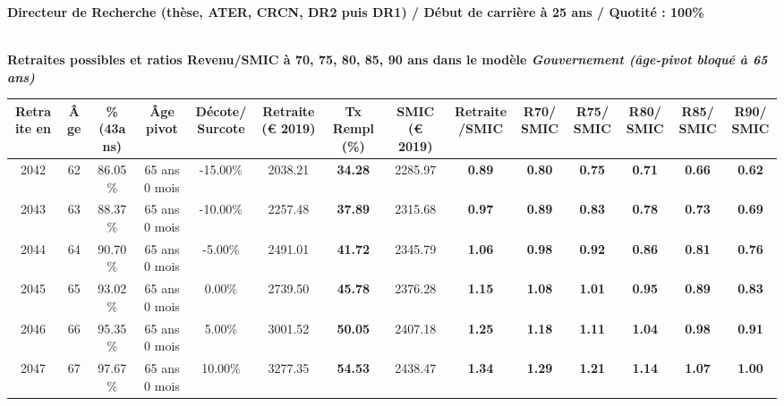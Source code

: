 {\bf \noindent Directeur de Recherche (thèse, ATER, CRCN, DR2 puis DR1) / Début de carrière à 25 ans / Quotité : 100\%}  ~ 

 ~\\{\bf \noindent Retraites possibles et ratios Revenu/SMIC à 70, 75, 80, 85, 90 ans dans le modèle \emph{Gouvernement (âge-pivot bloqué à 65 ans)}}  
 
\begin{adjustbox}{max width=\textwidth} 
\begin{tabular}[htb]{|c|c||c|c|c||c|c||c|c||c|c|c|c|c|} 
\hline 
 Retraite en &  Âge &  \%(43ans) &  Âge pivot &  Décote/Surcote &  Retraite (\euro{} 2019) &  Tx Rempl(\%) &  SMIC (\euro{} 2019) &  Retraite/SMIC &  R70/SMIC &  R75/SMIC &  R80/SMIC &  R85/SMIC &  R90/SMIC \\ 
\hline \hline 
 2042 &  62 &  86.05\% &  65 ans 0 mois &  -15.00\% &  2038.21 &  {\bf 34.28} &  2285.97 &  {\bf {\color{red} 0.89}} &  {\bf {\color{red} 0.80}} &  {\bf {\color{red} 0.75}} &  {\bf {\color{red} 0.71}} &  {\bf {\color{red} 0.66}} &  {\bf {\color{red} 0.62}} \\ 
\hline 
 2043 &  63 &  88.37\% &  65 ans 0 mois &  -10.00\% &  2257.48 &  {\bf 37.89} &  2315.68 &  {\bf {\color{red} 0.97}} &  {\bf {\color{red} 0.89}} &  {\bf {\color{red} 0.83}} &  {\bf {\color{red} 0.78}} &  {\bf {\color{red} 0.73}} &  {\bf {\color{red} 0.69}} \\ 
\hline 
 2044 &  64 &  90.70\% &  65 ans 0 mois &  -5.00\% &  2491.01 &  {\bf 41.72} &  2345.79 &  {\bf 1.06} &  {\bf {\color{red} 0.98}} &  {\bf {\color{red} 0.92}} &  {\bf {\color{red} 0.86}} &  {\bf {\color{red} 0.81}} &  {\bf {\color{red} 0.76}} \\ 
\hline 
 2045 &  65 &  93.02\% &  65 ans 0 mois &  0.00\% &  2739.50 &  {\bf 45.78} &  2376.28 &  {\bf 1.15} &  {\bf 1.08} &  {\bf 1.01} &  {\bf {\color{red} 0.95}} &  {\bf {\color{red} 0.89}} &  {\bf {\color{red} 0.83}} \\ 
\hline 
 2046 &  66 &  95.35\% &  65 ans 0 mois &  5.00\% &  3001.52 &  {\bf 50.05} &  2407.18 &  {\bf 1.25} &  {\bf 1.18} &  {\bf 1.11} &  {\bf 1.04} &  {\bf {\color{red} 0.98}} &  {\bf {\color{red} 0.91}} \\ 
\hline 
 2047 &  67 &  97.67\% &  65 ans 0 mois &  10.00\% &  3277.35 &  {\bf 54.53} &  2438.47 &  {\bf 1.34} &  {\bf 1.29} &  {\bf 1.21} &  {\bf 1.14} &  {\bf 1.07} &  {\bf {\color{red} 1.00}} \\ 
\hline 
\hline 
\end{tabular} 
\end{adjustbox} 
 
